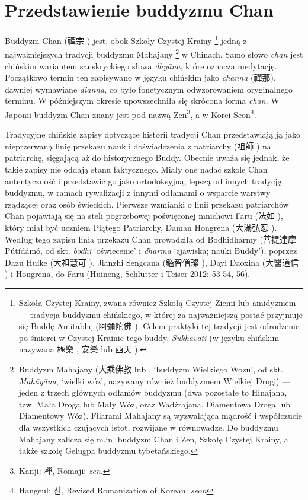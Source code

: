 \section{Przedstawienie buddyzmu Chan}
Buddyzm Chan (禪宗 ) jest, obok Szkoły Czystej Krainy%
\footnote{Szkoła Czystej Krainy, zwana również Szkołą Czystej Ziemi lub amidyzmem --- tradycja buddyzmu chińskiego, w której za najważniejszą postać przyjmuje się Buddę Amitābhę (阿彌陀佛 ). Celem praktyki tej tradycji jest odrodzenie po śmierci w Czystej Krainie tego buddy, \textit{Sukhavati} (w języku chińskim nazywana 極樂 , 安樂  lub 西天 ).}
jedną z najważniejszych tradycji buddyzmu Mahajany%
\footnote{Buddyzm Mahajany (大乘佛教  lub , `buddyzm Wielkiego Wozu', od skt. \textit{Mahāyāna}, `wielki wóz', nazywany również buddyzmem Wielkiej Drogi) --- jeden z trzech głównych odłamów buddyzmu (dwa pozostałe to Hinajana, tzw. Mała Droga lub Mały Wóz, oraz Wadżrajana, Diamentowa Droga lub Diamentowy Wóz). Filarami Mahajany są wyzwalająca mądrość i współczucie dla wszystkich czujących istot, rozwijane w równowadze. Do buddyzmu Mahajany zalicza się m.in. buddyzm Chan i Zen, Szkołę Czystej Krainy, a także szkołę Gelugpa buddyzmu tybetańskiego.}
w Chinach. Samo słowo \textit{chan} jest chińskim wariantem %
sanskryckiego słowa \textit{dhyāna}, które oznacza medytację.
Początkowo termin ten zapisywano w języku chińskim jako \textit{channa} (禪那), dawniej wymawiane \textit{dianna}, co było fonetycznym odwzorowaniem oryginalnego terminu.
W późniejszym okresie upowszechniła się skrócona forma \textit{chan}.
W Japonii buddyzm Chan znany jest pod nazwą Zen\footnote{Kanji: {\ipaexgothic 禅}, Rōmaji: \textit{zen}.}, a w Korei Seon\footnote{Hangeul: {\Korean 선}, Revised Romanization of Korean: \textit{seon}}.

Tradycyjne chińskie zapisy dotyczące historii tradycji Chan przedstawiają ją jako nieprzerwaną linię przekazu nauk i doświadczenia z patriarchy (祖師 ) na patriarchę, sięgającą aż do historycznego Buddy.
Obecnie uważa się jednak, że takie zapisy nie oddają stanu faktycznego.
Miały one nadać szkole Chan autentyczność i przedstawić go jako ortodoksyjną, lepszą od innych tradycję buddyzmu, w ramach rywalizacji z innymi odłamami o wsparcie warstwy rządzącej oraz osób świeckich.
Pierwsze wzmianki o linii przekazu patriarchów Chan pojawiają się na steli pogrzebowej poświęconej mnichowi Faru (法如 ), który miał być uczniem Piątego Patriarchy, Daman Hongrena (大滿弘忍 ).
Według tego zapisu linia przekazu Chan prowadziła od Bodhidharmy (菩提達摩 Pútídámó, od skt. \textit{bodhi} `oświecenie' i \textit{dharma} `zjawiska; nauki Buddy'), poprzez Dazu Huike  (大祖慧可 ), Jianzhi Sengcana (鑑智僧璨 ), Dayi Daoxina (大醫道信 ) i Hongrena, do Faru
(Huineng, Schlütter i Teiser 2012: 53-54, 56).

